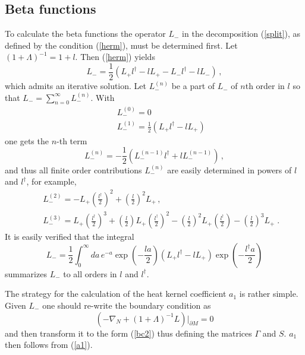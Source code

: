 \documentclass[a4paper,12pt]{article}
\begin{document}
\subsection{Beta functions}
To calculate the beta functions the
operator $L_-$ in the decomposition (\ref{split}),
as defined by the condition (\ref{herm}), must be determined first. Let
$(1+\Lambda )^{-1}=1+l$. Then (\ref{herm}) yields
\begin{equation}
L_-=\frac 12 \left( L_+l^\dag -lL_+ -L_-l^\dag -lL_-
\right) \,, \label{herm2}
\end{equation}
which  admits an iterative solution.
Let $L^{(n)}_-$ be a part of $L_-$ of $n$th order in $l$
so that $L_-=\sum_{n=0}^\infty L^{(n)}_-$. With
\begin{eqnarray}
&&L_-^{(0)}=0 \\
&&L_-^{(1)} =\frac 12 \left( L_+l^\dag -lL_+ \right)
\label{L1}\end{eqnarray}
one gets the $n$-th term
\begin{equation}
L_-^{(n)} =-\frac 12 \left( L_-^{(n-1)}l^\dag +
lL_-^{(n-1)} \right)\, ,
\end{equation}
and thus
all finite order contributions $L_-^{(n)}$ are easily determined
in powers of $l$ and $l^\dag$,
for example,
\begin{eqnarray}
&&L_-^{(2)} =-L_+ \left( \frac{l^\dag }2 \right)^2
+\left( \frac{l }2 \right)^2 L_+ \,, \\
&&L_-^{(3)} =L_+ \left( \frac{l^\dag }2 \right)^3
+\left( \frac{l }2 \right) L_+ \left( \frac{l^\dag }2 \right)^2
-\left( \frac{l }2 \right)^2 L_+ \left( \frac{l^\dag }2 \right)
-\left( \frac{l }2 \right)^3 L_+ \; .
\end{eqnarray}
It is easily verified that the integral
\begin{equation}
L_-=\frac 12 \int_0^\infty da\, e^{-a} \exp \left( -\frac{la}2 \right)
\left( L_+l^\dag -lL_+ \right) \exp \left( -\frac{l^\dag a}2 \right)
\label{compL-}
\end{equation}
summarizes $L_-$ to all orders in $l$ and $l^\dag$.

The strategy for the calculation of the heat kernel coefficient
$a_1$ is rather simple. Given $L_-$ one should re-write
the boundary condition as
\begin{equation}
(-\nabla_N +(1+\Lambda )^{-1} L )\vert_{\partial M}  =0 \label{bcLam}
\end{equation}
and then transform it to the form (\ref{bc2}) thus defining the matrices 
$\Gamma$ and $S$. $a_1$ then follows from (\ref{a1}). 
\end{document}

